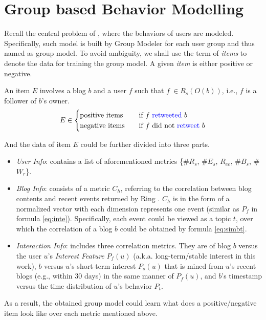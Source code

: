 \section{Group based Behavior Modelling}
\label{sec:gm}


Recall the central problem of \sys{}, where the \retg{} behaviors of users are modeled.
Specifically, such model is built by Group Modeler for each user group and thus named as group model.
To avoid ambiguity, we shall use the term of \textit{items} to denote the data for training the group model.
A given \textit{item} is either positive or negative.

\begin{definition}
\label{def:gm-it}
An item $E$ involves a blog $b$ and a user $f$ such that $f\ \in R_s(O(b))$, i.e., $f$ is a follower of $b$'s owner.
\begin{equation}
\label{eq:gm-it}
E \in
  \begin{cases}
    \text{positive items}       & \quad \text{if } f \text{ \textcolor{blue}{retweeted}{} } b\\
    \text{negative items}  		& \quad \text{if } f \text{ did not \textcolor{blue}{retweet}{} } b
  \end{cases}
\end{equation}
\end{definition}

And the data of item $E$ could be further divided into three parts.
\begin{itemize}
	\item \textit{User Info}: contains a list of aforementioned metrics \{\#$R_s$, \#$E_s$, $R_{ee}$, \#$B_s$, \#$W_r$\}.
	\item \textit{Blog Info}: consists of a metric $C_h$, referring to the correlation between blog contents and recent events returned by Ring \cite{IEEEexample:ring}. $C_h$ is in the form of a normalized vector with each dimension represents one event (similar as $P_f$ in formula \ref{eq:inte}). Specifically, each event could be viewed as a topic $t$, over which the correlation of a blog $b$ could be obtained by formula \ref{eq:simbt}.
	\item \textit{Interaction Info}: includes three correlation metrics. They are of blog $b$ versus the user $u$'s \textit{Interest Feature} $P_f(u)$ (a.k.a. long-term/stable interest in this work), $b$ versus $u$'s short-term interest $P_s(u)$ that is mined from $u$'s recent blogs (e.g., within 30 days) in the same manner of $P_f(u)$, and $b$'s timestamp versus the time distribution of $u$'s \retg{} behavior $P_t$.
\end{itemize}
As a result, the obtained group model could learn what does a positive/negative item look like over each metric mentioned above.










